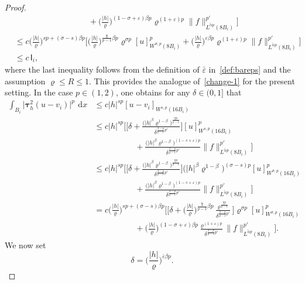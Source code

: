 \documentclass[10pt,a4paper]{amsart}
\renewcommand{\d}{\:\! \mathrm{d}}
\renewcommand{\epsilon}{\varepsilon}
\renewcommand{\rho}{\varrho}
\newcommand\sfI{{\boldsymbol{\mathsf I}}}
\begin{document}
\begin{proof}
\begin{align*}
    &\qquad\qquad\qquad\qquad\quad +
    \Big(\frac{|h|}{\rho}\Big)^{(1-\sigma+\epsilon)\beta p} \rho^{(1+\epsilon)p}
    \|f\|_{L^{\tilde\alpha p}(8B_i)}^{p'} \bigg] \\
    &\le
    c \Big(\frac{|h|}{\rho}\Big)^{sp+(\sigma-s)\beta p} 
    \bigg[ 
    \Big(\frac{|h|}{\rho}\Big)^{\frac{\chi}{p-1}\beta p} \rho^{\sigma p} [u]^p_{W^{\sigma,p}(8B_i)} 
    +
    \Big(\frac{|h|}{\rho}\Big)^{\epsilon\beta p} \rho^{(1+\epsilon)p}
    \|f\|_{L^{\tilde\alpha p}(8B_i)}^{p'} \bigg]\\
    &\le 
    c\, \sfI_i,
\end{align*}
where the last inequality follows from the definition of $\bar\epsilon$ in~\eqref{def:bareps} and the assumption $\rho \le R \le 1$. This provides the analogue of~\eqref{change-1} for the present setting.
In the case $p\in(1,2)$, one obtains for any $\delta \in (0,1]$ that
\begin{align*}
    \int_{B_i} \big|\boldsymbol\tau_h^2 (u - v_i)\big|^p \,\d x
    &\le
    c |h|^{sp} [u-v_i]_{W^{s,p}(16B_i)} \\
    &\le
    c |h|^{sp} \Bigg[
    \bigg[\delta +
    \frac{\big(|h|^\beta\rho^{1-\beta}\big)^{\frac{\chi p}{p-1}}}{\delta^{\frac{2-p}{p-1}p'}}\bigg][u]^p_{W^{s,p}(16B_i)} \\
    &\qquad\qquad\quad +
    \frac{\big(|h|^\beta\rho^{1-\beta}\big)^{(1-s+\epsilon)p}}{\delta^{\frac{2-p}{p-1}p'}} 
    \|f\|_{L^{\tilde\alpha p}(8B_i)}^{p'}\Bigg] \nonumber\\
    &\le
    c |h|^{sp} \Bigg[
    \bigg[\delta +
    \frac{\big(|h|^\beta\rho^{1-\beta}\big)^{\frac{\chi p}{p-1}}}{\delta^{\frac{2-p}{p-1}p'}}\bigg]\big(|h|^\beta\rho^{1-\beta}\big)^{(\sigma-s)p} [u]_{W^{\sigma,p}(16B_i)}^p \\
    &\qquad\qquad\quad + 
    \frac{\big(|h|^\beta\rho^{1-\beta}\big)^{(1-s+\epsilon)p}}{\delta^{\frac{2-p}{p-1}p'}}
    \|f\|_{L^{\tilde\alpha p}(8B_i)}^{p'} \Bigg] \\
    &=
    c \Big(\frac{|h|}{\rho}\Big)^{sp+(\sigma-s)\beta p} \Bigg[
    \bigg[\delta +
    \Big(\frac{|h|}{\rho}\Big)^{\frac{\chi}{p-1}\beta p} \frac{\rho^{\frac{\chi p}{p-1}}}{\delta^{\frac{2-p}{p-1}p'}}\bigg]
    \rho^{\sigma p}[u]_{W^{\sigma,p}(16B_i)}^p \\
    &\qquad\qquad\quad + 
    \Big(\frac{|h|}{\rho}\Big)^{(1-\sigma+\epsilon)\beta p} \frac{\rho^{(1+\epsilon)p}}{\delta^{\frac{2-p}{p-1}p'}}
    \|f\|_{L^{\tilde\alpha p}(8B_i)}^{p'} \Bigg].
\end{align*}
We now set 
\[
\delta=\Big(\frac{|h|}{\rho}\Big)^{\bar\epsilon\beta p}.
\]
\end{proof}
\end{document}
